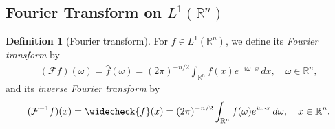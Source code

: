 \documentclass{article}
\numberwithin{equation}{section}
\newcommand{\bbR}{\mathbb{R}}
\renewcommand{\cal}{\mathcal}
\newcommand{\wh}{\widehat}
\theoremstyle{plain}
\theoremstyle{definition}
\newtheorem{definition}[theorem]{Definition}
\begin{document}
\newpage
\subsection{Fourier Transform on $L^1(\bbR^n)$}
\begin{definition}[Fourier transform]
For $f\in L^1(\bbR^n)$, we define its \textit{Fourier transform} by
\begin{align*}
	(\cal{F}f)(\omega)=\wh{f}(\omega)=(2\pi)^{-n/2}\int_{\bbR^n} f(x)e^{-i \omega\cdot x}\,dx,\quad \omega\in\bbR^n,
\end{align*}
and its \textit{inverse Fourier transform} by
\begin{align*}
	(\cal{F}^{-1}f)(x)=\widecheck{f}(x)=(2\pi)^{-n/2}\int_{\bbR^n} f(\omega)e^{i \omega\cdot x}\,d\omega,\quad x\in\bbR^n.
\end{align*}
\end{definition}
\end{document}

